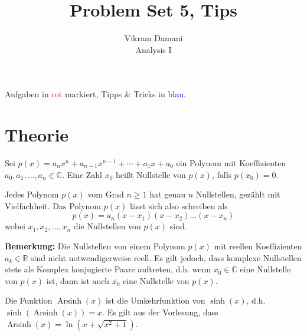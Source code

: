 \documentclass[12pt]{article}
\DeclareMathOperator{\arcsinh}{Arsinh}
\newcommand{\R}{\mathbb{R}} %
\newcommand{\C}{\mathbb{C}}
\newenvironment{definition}[2][Definition]{\begin{trivlist}
        \item[\hskip \labelsep {\bfseries #1}\hskip \labelsep {\bfseries #2.}]}{\flushright{$\square$}\end{trivlist}}
\newenvironment{remark}[2][Bemerkung]{\begin{trivlist}
        \item[\hskip \labelsep {\bfseries #1}\hskip \labelsep {\bfseries #2.}]}{\end{trivlist}}
\begin{document}
\title{Problem Set 5, Tips}
\author{Vikram Damani\\
        Analysis I}

\maketitle
Aufgaben in \textcolor{red}{rot} markiert, Tipps \& Tricks in \textcolor{blue}{blau}.

\section{Theorie}

\begin{definition}{[Fundamentalsatz der Algebra]}
        Sei $p(x)=a_n x^n+a_{n-1}x^{n-1}+ \cdots +a_1x+a_0$ ein Polynom mit Koeffizienten $a_0,a_1,\ldots,a_n\in\C$. Eine Zahl $x_0$ heißt Nullstelle von $p(x)$, falls $p(x_0)=0$.

        Jedes Polynom $p(x)$ vom Grad $n\geq 1$ hat genau $n$ Nullstellen, gezählt mit
        Vielfachheit. Das Polynom $p(x)$ lässt sich also schreiben als
        \begin{equation}
                p(x)=a_n(x-x_1)(x-x_2)\ldots(x-x_n)
        \end{equation}
        wobei $x_1,x_2,\ldots,x_n$ die Nullstellen von $p(x)$ sind.

        \textbf{Bemerkung:} Die Nullstellen von einem Polynom $p(x)$ mit reellen Koeffizienten $a_k\in\R$ sind nicht notwendigerweise reell. Es gilt jedoch, dass komplexe Nullstellen stets als Komplex konjugierte Paare auftreten, d.h. wenn $x_0\in\C$ eine Nullstelle von $p(x)$ ist, dann ist auch $\overline{x_0}$ eine Nullstelle von $p(x)$.
\end{definition}

\begin{remark}{[$\arcsinh$]}
        Die Funktion $\arcsinh(x)$ ist die Umkehrfunktion von $\sinh(x)$, d.h. $\sinh(\arcsinh(x))=x$.
        Es gilt aus der Vorlesung, dass $\arcsinh(x) = \ln(x + \sqrt{x^2 + 1})$.
\end{remark}
\end{document}
